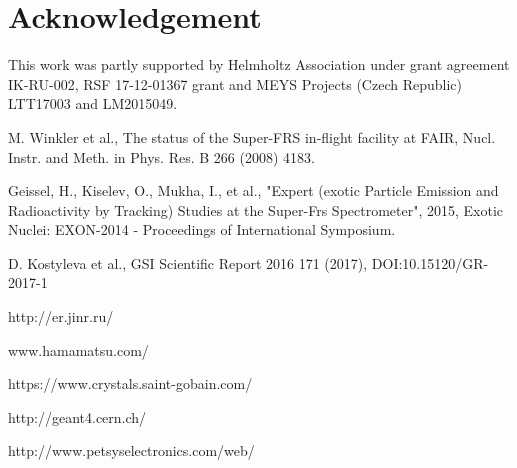 \documentclass{webofc}
\begin{document}
\section{Acknowledgement}
This  work was partly supported by Helmholtz Association under grant agreement IK-RU-002, RSF 17-12-01367 grant and MEYS Projects (Czech Republic) LTT17003 and LM2015049.

	
\begin{thebibliography}{99}
	
	M. Winkler et al., The status of the Super-FRS in-flight facility at FAIR, Nucl. Instr. and Meth. in Phys. Res. B 266 (2008) 4183.
	
	Geissel, H., Kiselev, O., Mukha, I., et al., "Expert (exotic Particle Emission and Radioactivity by Tracking) Studies at the Super-Frs Spectrometer", 2015, Exotic Nuclei: EXON-2014 - Proceedings of International Symposium.
	
	D. Kostyleva et al., GSI Scientific Report 2016 171 (2017), DOI:10.15120/GR-2017-1
	
	http://er.jinr.ru/
	
	www.hamamatsu.com/
	
	https://www.crystals.saint-gobain.com/
	
	http://geant4.cern.ch/
	
	http://www.petsyselectronics.com/web/
	
\end{thebibliography}
\end{document}
